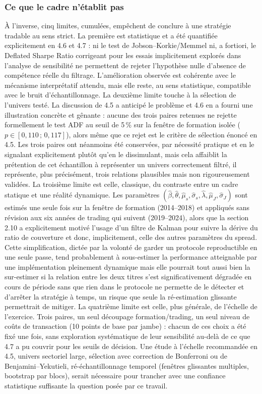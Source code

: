 \documentclass{article}
\begin{document}
\subsubsection*{Ce que le cadre n'établit pas}
À l'inverse, cinq limites, cumulées, empêchent de conclure à une stratégie tradable au sens strict. La première est statistique et a été quantifiée explicitement en 4.6 et 4.7 : ni le test de Jobson--Korkie/Memmel ni, a fortiori, le Deflated Sharpe Ratio corrigeant pour les essais implicitement explorés dans l'analyse de sensibilité ne permettent de rejeter l'hypothèse nulle d'absence de compétence réelle du filtrage. L'amélioration observée est cohérente avec le mécanisme interprétatif attendu, mais elle reste, au sens statistique, compatible avec le bruit d'échantillonnage.
La deuxième limite touche à la sélection de l'univers testé. La discussion de 4.5 a anticipé le problème et 4.6 en a fourni une illustration concrète et gênante : aucune des trois paires retenues ne rejette formellement le test ADF au seuil de 5\,\% sur la fenêtre de formation isolée ($p\in[0{,}110\,;\,0{,}117]$), alors même que ce rejet est le critère de sélection énoncé en 4.5. Les trois paires ont néanmoins été conservées, par nécessité pratique et en le signalant explicitement plutôt qu'en le dissimulant, mais cela affaiblit la prétention de cet échantillon à représenter un univers correctement filtré, il représente, plus précisément, trois relations plausibles mais non rigoureusement validées.
La troisième limite est celle, classique, du contraste entre un cadre statique et une réalité dynamique. Les paramètres $(\hat\beta,\hat\theta,\hat\mu_s,\hat\sigma_s,\hat\lambda,\hat\mu_J,\hat\sigma_J)$ sont estimés une seule fois sur la fenêtre de formation (2014--2018) et appliqués sans révision aux six années de trading qui suivent (2019--2024), alors que la section 2.10 a explicitement motivé l'usage d'un filtre de Kalman pour suivre la dérive du ratio de couverture et donc, implicitement, celle des autres paramètres du spread. Cette simplification, dictée par la volonté de garder un protocole reproductible en une seule passe, tend probablement à sous-estimer la performance atteignable par une implémentation pleinement dynamique mais elle pourrait tout aussi bien la sur-estimer si la relation entre les deux titres s'est significativement dégradée en cours de période sans que rien dans le protocole ne permette de le détecter et d'arrêter la stratégie à temps, un risque que seule la ré-estimation glissante permettrait de mitiger.
La quatrième limite est celle, plus générale, de l'échelle de l'exercice. Trois paires, un seul découpage formation/trading, un seul niveau de coûts de transaction (10 points de base par jambe) : chacun de ces choix a été fixé une fois, sans exploration systématique de leur sensibilité au-delà de ce que 4.7 a pu couvrir pour les seuils de décision. Une étude à l'échelle recommandée en 4.5, univers sectoriel large, sélection avec correction de Bonferroni ou de Benjamini--Yekutieli, ré-échantillonnage temporel (fenêtres glissantes multiples, bootstrap par blocs), serait nécessaire pour trancher avec une confiance statistique suffisante la question posée par ce travail.
\end{document}
